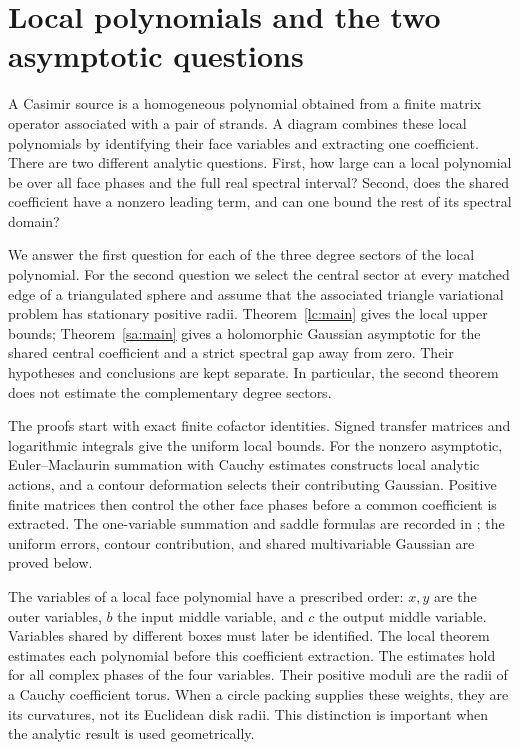 \section{Local polynomials and the two asymptotic questions}\label{cs:introduction}
A Casimir source is a homogeneous polynomial obtained from a finite
matrix operator associated with a pair of strands. A diagram combines
these local polynomials by identifying their face variables and extracting
one coefficient. There are two different analytic questions. First, how
large can a local polynomial be over all face phases and the full real
spectral interval? Second, does the shared coefficient have a nonzero
leading term, and can one bound the rest of its spectral domain?

We answer the first question for each of the three degree sectors of the
local polynomial. For the second question we select the central sector
at every matched edge of a triangulated sphere and assume that the
associated triangle variational problem has stationary positive radii.
Theorem~\ref{lc:main} gives the local upper bounds;
Theorem~\ref{sa:main} gives a holomorphic Gaussian asymptotic for the
shared central coefficient and a strict spectral gap away from zero.
Their hypotheses and conclusions are kept separate. In particular, the
second theorem does not estimate the complementary degree sectors.

The proofs start with exact finite cofactor identities. Signed transfer
matrices and logarithmic integrals give the uniform local bounds.
For the nonzero asymptotic, Euler--Maclaurin summation with Cauchy
estimates constructs local analytic actions, and a contour deformation
selects their contributing Gaussian. Positive finite matrices then
control the other face phases before a common coefficient is extracted.
The one-variable summation and saddle formulas are recorded in
\cite[\S2.10(i), \S2.4(iv)]{DLMF}; the uniform errors, contour
contribution, and shared multivariable Gaussian are proved below.

The variables of a local face polynomial have a prescribed order:
\(x,y\) are the outer variables, \(b\) the input middle variable, and
\(c\) the output middle variable. Variables shared by different boxes
must later be identified. The local theorem estimates each polynomial before this coefficient extraction. The estimates hold for all complex phases of the four variables.
Their positive moduli are the radii of a Cauchy coefficient torus.
When a circle packing supplies these weights, they are its curvatures,
not its Euclidean disk radii. This distinction is important when the
analytic result is used geometrically.

